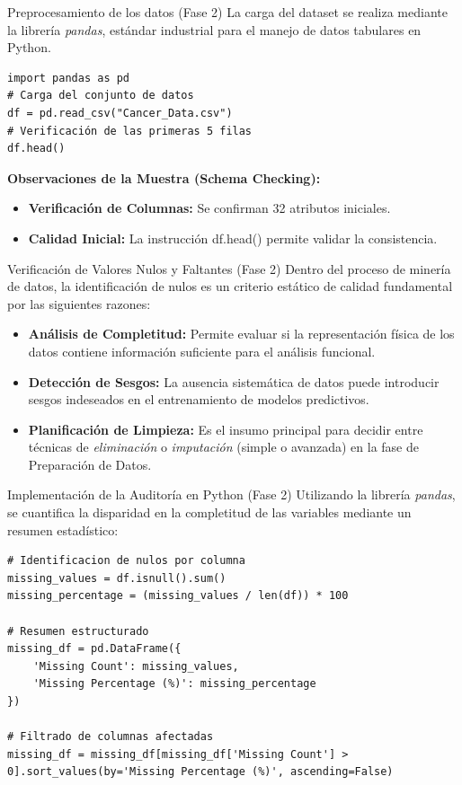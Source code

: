 \documentclass{beamer}
\begin{document}
	\begin{frame}[fragile]{Preprocesamiento de los datos (Fase 2)}
		La carga del dataset se realiza mediante la librería \textit{pandas}, estándar industrial para el manejo de datos tabulares en Python.
		
		\begin{lstlisting}[style=colab]
import pandas as pd
# Carga del conjunto de datos
df = pd.read_csv("Cancer_Data.csv")
# Verificación de las primeras 5 filas
df.head()
		\end{lstlisting}
		
		\textbf{Observaciones de la Muestra (Schema Checking):}
		\begin{itemize}
			\item \textbf{Verificación de Columnas:} Se confirman 32 atributos iniciales.
			\item \textbf{Calidad Inicial:} La instrucción df.head() permite validar la consistencia.
		\end{itemize}
	\end{frame}
	
	\begin{frame}{Verificación de Valores Nulos y Faltantes (Fase 2)}
		Dentro del proceso de minería de datos, la identificación de nulos es un criterio estático de calidad fundamental por las siguientes razones:
		\begin{itemize}
			\item<2-> \textbf{Análisis de Completitud:} Permite evaluar si la representación física de los datos contiene información suficiente para el análisis funcional.
			\item<3-> \textbf{Detección de Sesgos:} La ausencia sistemática de datos puede introducir sesgos indeseados en el entrenamiento de modelos predictivos.
			\item<4-> \textbf{Planificación de Limpieza:} Es el insumo principal para decidir entre técnicas de \textit{eliminación} o \textit{imputación} (simple o avanzada) en la fase de Preparación de Datos.
		\end{itemize}
	\end{frame}
	
	\begin{frame}[fragile]{Implementación de la Auditoría en Python (Fase 2)}
		Utilizando la librería \textit{pandas}, se cuantifica la disparidad en la completitud de las variables mediante un resumen estadístico:
		
		\begin{lstlisting}[style=colab]
# Identificacion de nulos por columna
missing_values = df.isnull().sum()
missing_percentage = (missing_values / len(df)) * 100

# Resumen estructurado
missing_df = pd.DataFrame({
	'Missing Count': missing_values,
	'Missing Percentage (%)': missing_percentage
})

# Filtrado de columnas afectadas
missing_df = missing_df[missing_df['Missing Count'] > 0].sort_values(by='Missing Percentage (%)', ascending=False)
		\end{lstlisting}
	\end{frame}
	
\end{document}
